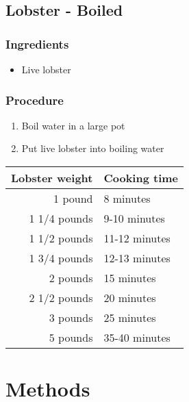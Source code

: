 \documentclass[10pt]{book}
\begin{document}

\newpage
\section*{Lobster - Boiled}
\subsection*{Ingredients}
	\begin{itemize}
		\item Live lobster
	\end{itemize}
\subsection*{Procedure}
	\begin{enumerate}
		\item Boil water in a large pot
		\item Put live lobster into boiling water
	\end{enumerate}
	
	\vspace{1cm}
	
	\begin{center}
	\begin{tabular}{r | l}
		Lobster weight & Cooking time\\
		\hline
		1 pound &	8 minutes\\
		1 1/4 pounds &	9-10 minutes\\
		1 1/2 pounds &	11-12 minutes\\
		1 3/4 pounds &	12-13 minutes\\
		2 pounds &	15 minutes\\
		2 1/2 pounds &	20 minutes\\
		3 pounds &	25 minutes\\
		5 pounds &	35-40 minutes\\
	\end{tabular}
	\end{center}
\newpage


\newpage
\chapter*{Methods}
\end{document}
